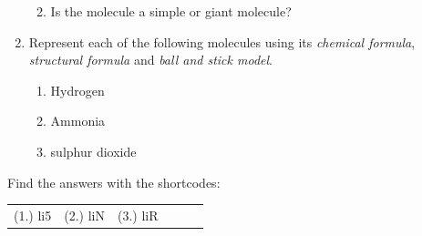 \begin{enumerate}[noitemsep, label=\textbf{\arabic*}. ]
\begin{enumerate}[noitemsep, label=\textbf{\alph*}. ]
\label{m38120*uid20}\item Is the molecule a simple or giant molecule?
\end{enumerate}
\label{m38120*uid21}\item Represent each of the following molecules using its 
\textsl{chemical formula}, \textsl{structural formula} and \textsl{ball and stick model}.
\label{m38120*id308228}\begin{enumerate}[noitemsep, label=\textbf{\alph*}. ] 
            \label{m38120*uid22}\item Hydrogen\label{m38120*uid23}\item Ammonia\label{m38120*uid24}\item sulphur dioxide
\end{enumerate}
\end{enumerate}
\par {} Find the answers with the shortcodes:
 \par \begin{tabular}[h]{cccccc}
 (1.) li5  &  (2.) liN  &  (3.) liR  & \end{tabular}
